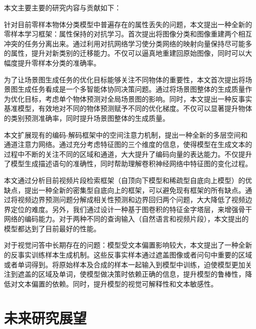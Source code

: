 本文主要主要的研究内容与贡献如下：
\begin{asparaenum}
\item 针对目前零样本物体分类模型中普遍存在的属性丢失的问题，本文提出一种全新的零样本学习框架：属性保持的对抗学习。首次提出将图像分类和图像重建两个相互冲突的任务分离出来。通过利用对抗网络学习使分类网络的映射向量保持尽可能多的属性，提升对新类别的迁移能力。不仅可以逼真地重建回原始图像，同时可以大幅度提升零样本分类的准确率。

\item 为了让场景图生成任务的优化目标能够关注不同物体的重要性，本文首次提出将场景图生成任务看成是一个多智能体协同决策问题。通过将场景图整体的生成质量作为优化目标，考虑单个物体预测对全局场景图的影响。同时，本文提出一种反事实基准模型，有效地对不同的物体预测赋予不同的优化梯度。不仅可以显著提升物体的类别预测准确率，同时提升场景图整体的生成质量。

\item 本文扩展现有的编码-解码框架中的空间注意力机制，提出一种全新的多层空间和通道注意力网络。通过充分考虑特征图的三个维度的信息，使得模型在生成文本的过程中不断的关注不同的区域和通道，大大提升了编码向量的表达能力。不仅提升了模型生成描述语句的准确性，同时帮助理解卷积神经网络中特征图的变化过程。

\item 本文通过分析目前视频片段检索框架（自顶向下模型和稀疏型自底向上模型）的优缺点，提出一种全新的密集型自底向上的框架，可以避免现有框架的所有缺点。通过将视频边界预测问题分解成相关性预测和边界回归两个问题，大大降低了视频边界定位的难度。另外，我们通过设计一种基于图卷积的特征金字塔层，来增强骨干网络的编码能力。对于两种不同的查询输入（自然语言和视频片段），本文提出的模型都达到了目前最好的性能。

\item 对于视觉问答中长期存在的问题：模型受文本偏置影响较大，本文提出了一种全新的反事实训练样本生成机制。这些反事实样本通过遮盖图像或者问句中重要的区域或者单词得到。将原始样本及合成的样本一起输入到模型中训练，迫使模型更加关注到遮盖的区域及单词，使模型做决策时依赖正确的信息，提升模型的鲁棒性，降低对文本偏置的依赖。同时，提升模型的视觉可解释性和文本敏感性。

\end{asparaenum}

\section{未来研究展望}

